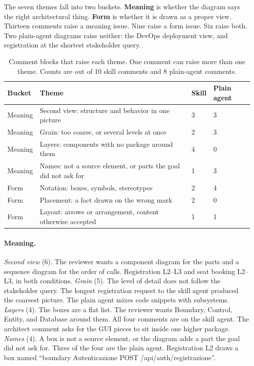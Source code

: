 \documentclass[11pt]{article}
\begin{document}
The seven themes fall into two buckets. \textbf{Meaning} is whether the diagram says the right architectural thing. \textbf{Form} is whether it is drawn as a proper view. Thirteen comments raise a meaning issue. Nine raise a form issue. Six raise both. Two plain-agent diagrams raise neither: the DevOps deployment view, and registration at the shortest stakeholder query.

\begin{table}[h]
\centering
\small
\begin{tabularx}{\textwidth}{@{}llYY@{}}
\toprule
Bucket & Theme & Skill & Plain agent \\
\midrule
Meaning & Second view: structure and behavior in one picture & 3 & 3 \\
Meaning & Grain: too coarse, or several levels at once & 2 & 3 \\
Meaning & Layers: components with no package around them & 4 & 0 \\
Meaning & Names: not a source element, or parts the goal did not ask for & 1 & 3 \\
\midrule
Form & Notation: boxes, symbols, stereotypes & 2 & 4 \\
Form & Placement: a fact drawn on the wrong mark & 2 & 0 \\
Form & Layout: arrows or arrangement, content otherwise accepted & 1 & 1 \\
\bottomrule
\end{tabularx}
\caption{Comment blocks that raise each theme. One comment can raise more than one theme. Counts are out of 10 skill comments and 8 plain-agent comments.}
\label{tab:themes}
\end{table}

\paragraph{Meaning.}
\textit{Second view} (6). The reviewer wants a component diagram for the parts and a sequence diagram for the order of calls. Registration L2--L3 and seat booking L2--L3, in both conditions.
\textit{Grain} (5). The level of detail does not follow the stakeholder query. The longest registration request to the skill agent produced the coarsest picture. The plain agent mixes code snippets with subsystems.
\textit{Layers} (4). The boxes are a flat list. The reviewer wants Boundary, Control, Entity, and Database around them. All four comments are on the skill agent. The architect comment asks for the GUI pieces to sit inside one higher package.
\textit{Names} (4). A box is not a source element, or the diagram adds a part the goal did not ask for. Three of the four are the plain agent. Registration L2 draws a box named ``boundary Autenticazione POST /api/auth/registrazione''.
\end{document}
